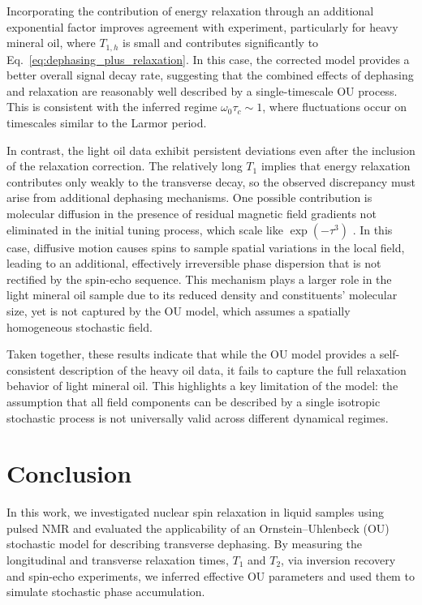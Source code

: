 \documentclass[%
 reprint,
 amsmath,amssymb,
 aps,
]{revtex4-2}
\begin{document}
Incorporating the contribution of energy relaxation through an additional exponential factor improves agreement with experiment, particularly for heavy mineral oil, where $T_{1,h}$ is small and contributes significantly to Eq.~\ref{eq:dephasing_plus_relaxation}. In this case, the corrected model provides a better overall signal decay rate, suggesting that the combined effects of dephasing and relaxation are reasonably well described by a single-timescale OU process. This is consistent with the inferred regime $\omega_0 \tau_c \sim 1$, where fluctuations occur on timescales similar to the Larmor period.

In contrast, the light oil data exhibit persistent deviations even after the inclusion of the relaxation correction. The relatively long $T_1$ implies that energy relaxation contributes only weakly to the transverse decay, so the observed discrepancy must arise from additional dephasing mechanisms. One possible contribution is molecular diffusion in the presence of residual magnetic field gradients not eliminated in the initial tuning process, which scale like $\exp{(-\tau^3)}$ \cite{teachspin_ps2}. In this case, diffusive motion causes spins to sample spatial variations in the local field, leading to an additional, effectively irreversible phase dispersion that is not rectified by the spin-echo sequence. This mechanism plays a larger role in the light mineral oil sample due to its reduced density and constituents' molecular size, yet is not captured by the OU model, which assumes a spatially homogeneous stochastic field.

Taken together, these results indicate that while the OU model provides a self-consistent description of the heavy oil data, it fails to capture the full relaxation behavior of light mineral oil. This highlights a key limitation of the model: the assumption that all field components can be described by a single isotropic stochastic process is not universally valid across different dynamical regimes.

\section{Conclusion}
\label{sec:conclusion}
In this work, we investigated nuclear spin relaxation in liquid samples using pulsed NMR and evaluated the applicability of an Ornstein--Uhlenbeck (OU) stochastic model for describing transverse dephasing. By measuring the longitudinal and transverse relaxation times, $T_1$ and $T_2$, via inversion recovery and spin-echo experiments, we inferred effective OU parameters and used them to simulate stochastic phase accumulation.
\end{document}
